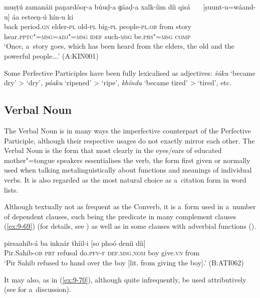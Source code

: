 \begin{exe}
\ex
\label{ex:9-68}
\gll muṣṭú zamanáii paṇardóoṛ-a búuḍ-a ɡáaḍ-a xalk-íim díi {qisá~~~} [ṣuunt-u=wáand-u] áa eeteeṇ-ú hín-u ki\\
back period.\textsc{gn} elder-\textsc{pl} old-\textsc{pl} big-\textsc{pl}  people-\textsc{pl.ob} from story hear.\textsc{pptc"=msg=adj"=msg} \textsc{idef} such-\textsc{msg} be.\textsc{prs"=msg} \textsc{comp} \\
\glt `Once, a~story goes, which has been heard from the elders, the old and the powerful people{\ldots}.'
(A:KIN001)
\end{exe}

Some Perfective Participles have been fully lexicalised as adjectives: \textit{šúku} `became dry' {\textgreater} `dry', \textit{páaku} `ripened' {\textgreater} `ripe', \textit{khíndu} `became tired' {\textgreater} `tired', etc.


\subsection{Verbal Noun}
\label{subsec:9-3-3}


The Verbal Noun is in many ways the imperfective counterpart of the Perfective Participle, although their respective usages do not exactly mirror each other. The Verbal Noun is the form that most clearly in the eyes/ears of educated mother"=tongue speakers essentialises the verb, the form first given or normally used when talking metalinguistically about functions and meanings of individual verbs. It is also regarded as the most natural choice as a~citation form in word lists. 


Although textually not as frequent as the Converb, it is a~form used in a~number of dependent clauses, such being the predicate in many complement clauses (\ref{ex:9-69}) (for details, see ) as well as in some clauses with adverbial functions ().

\begin{exe}
\ex
\label{ex:9-69}
\gll pirsaahib-á ba inkaár thíil-i [so phoó deníi díi] \\
Pir.Sahib-\textsc{ob} \textsc{prt} refusal do.\textsc{pfv-f} \textsc{def.msg.nom} boy give.\textsc{vn} from \\
\glt `Pir Sahib refused to hand over the boy [lit. from giving the boy].' (B:ATI062)
\end{exe}

It may also, as in (\ref{ex:9-70}), although quite infrequently, be used attributively (see  for a~discussion).

